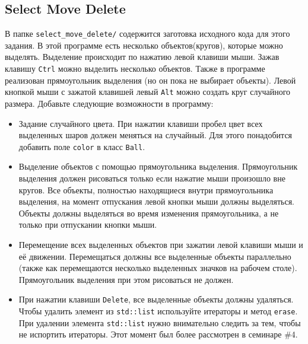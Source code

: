 \documentclass{article}
\begin{document}
\subsection{Select Move Delete}
 В папке \texttt{select\_move\_delete/} содержится заготовка исходного кода для этого задания. В этой программе есть несколько объектов(кругов), которые можно выделять. Выделение происходит по нажатию левой клавиши мыши. Зажав клавишу \texttt{Ctrl} можно выделить несколько объектов. Также в программе реализован прямоугольник выделения (но он пока не выбирает объекты). Левой кнопкой мыши с зажатой клавишей левый \texttt{Alt} можно создать круг случайного размера. Добавьте следующие возможности в программу:
\begin{itemize}
\item Задание случайного цвета. При нажатии клавиши пробел цвет всех выделенных шаров должен меняться на случайный. Для этого понадобится добавить поле \texttt{color} в класс \texttt{Ball}.

\item Выделение объектов с помощью прямоугольника выделения. Прямоугольник выделения должен рисоваться только если нажатие мыши произошло вне кругов. Все объекты, полностью находящиеся внутри прямоугольника выделения, на момент отпускания левой кнопки мыши должны выделяться. Объекты должны выделяться во время изменения прямоугольника, а не только при отпускании кнопки мыши.

\item Перемещение всех выделенных объектов при зажатии левой клавиши мыши и её движении. Перемещаться должны все выделенные объекты параллельно (также как перемещаются несколько выделенных значков на рабочем столе). Прямоугольник выделения при этом рисоваться не должен.

\item При нажатии клавиши \texttt{Delete}, все выделенные объекты должны удаляться. Чтобы удалить элемент из \texttt{std::list} используйте итераторы и метод \texttt{erase}. При удалении элемента \texttt{std::list} нужно внимательно следить за тем, чтобы не испортить итераторы. Этот момент был более рассмотрен в семинаре \#4.


\end{itemize}
\end{document}
